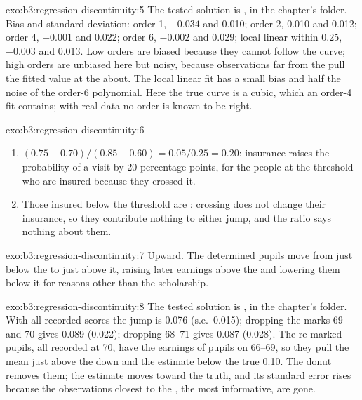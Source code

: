 \begin{solution}{exo:b3:regression-discontinuity:5}
The tested solution is , in the chapter's
 folder. Bias and standard deviation: order 1, $-0.034$ and
0.010; order 2, 0.010 and 0.012; order 4, $-0.001$ and 0.022; order 6, $-0.002$
and 0.029; local linear within 0.25, $-0.003$ and 0.013. %
Low orders are biased because they cannot follow the curve; high orders are
unbiased here but noisy, because observations far from the  pull the
fitted value at the  about. The local linear fit has a small bias and
half the noise of the order-6 polynomial. Here the true curve is a cubic, which
an order-4 fit contains; with real data no order is known to be right.
\end{solution}

\begin{solution}{exo:b3:regression-discontinuity:6}
\begin{enumerate}
\item $(0.75 - 0.70)/(0.85 - 0.60) = 0.05/0.25 = 0.20$: insurance raises the
probability of a visit by 20 percentage points, for the people at the threshold
who are insured because they crossed it.
\item Those insured below the threshold are : crossing does not
change their insurance, so they contribute nothing to either jump, and the ratio
says nothing about them.
\end{enumerate}
\end{solution}

\begin{solution}{exo:b3:regression-discontinuity:7}
Upward. The determined pupils move from just below the  to just above it,
raising later earnings above the  and lowering them below it for reasons
other than the scholarship.
\end{solution}

\begin{solution}{exo:b3:regression-discontinuity:8}
The tested solution is , in the chapter's 
folder. With all recorded scores the jump is 0.076 (s.e.\ 0.015); dropping the
marks 69 and 70 gives 0.089 (0.022); dropping 68--71 gives 0.087 (0.028).
The re-marked pupils, all recorded at 70, have the earnings of pupils on 66--69,
so they pull the mean just above the  down and the estimate below the true
0.10. The donut removes them; the estimate moves toward the truth, and its
standard error rises because the observations closest to the , the most
informative, are gone.
\end{solution}

